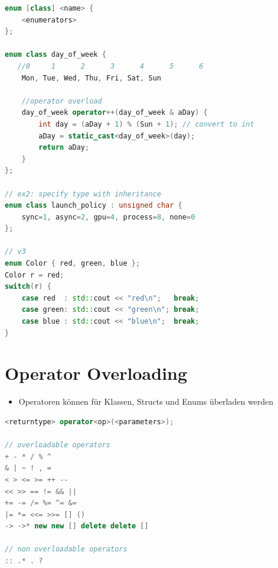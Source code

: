 \begin{lstlisting}[language=C++, caption=Enum]
enum [class] <name> { 
	<enumerators>
};

enum class day_of_week {
   //0     1      2      3      4      5      6
	Mon, Tue, Wed, Thu, Fri, Sat, Sun
	
	//operator overload
	day_of_week operator++(day_of_week & aDay) {
		int day = (aDay + 1) % (Sun + 1); // convert to int
		aDay = static_cast<day_of_week>(day);
		return aDay;
	}
};

// ex2: specify type with inheritance
enum class launch_policy : unsigned char {
	sync=1, async=2, gpu=4, process=8, none=0
};

// v3
enum Color { red, green, blue };
Color r = red;
switch(r) {
	case red  : std::cout << "red\n";   break;
	case green: std::cout << "green\n"; break;
	case blue : std::cout << "blue\n";  break;
}
\end{lstlisting}

\section{Operator Overloading}
\begin{itemize}
	\item Operatoren können für Klassen, Structs und Enums überladen werden
\end{itemize}
\begin{lstlisting}[language=C++, caption=Mögliche Operatoren zum Überladen]
<returntype> operator<op>(<parameters>);

// overloadable operators
+ - * / % ^
& | ~ ! , =
< > <= >= ++ --
<< >> == != && ||
+= -= /= %= ^= &=
|= *= <<= >>= [] ()
-> ->* new new [] delete delete []

// non overloadable operators
:: .* . ?
\end{lstlisting}

